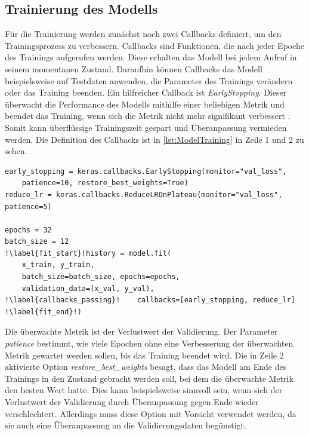 \subsection{Trainierung des Modells}
\label{sec:Trainierung}
Für die Trainierung werden zunächst noch zwei Callbacks definiert, um den Trainingsprozess zu verbessern.
Callbacks sind Funktionen, die nach jeder Epoche des Trainings aufgerufen werden.
Diese erhalten das Modell bei jedem Aufruf in seinem momentanen Zustand.
Daraufhin können Callbacks das Modell beispielsweise auf Testdaten anwenden, die Parameter des Trainings verändern oder das Training beenden.
Ein hilfreicher Callback ist \emph{EarlyStopping}.
Dieser überwacht die Performance des Modells mithilfe einer beliebigen Metrik und beendet das Training, wenn sich die Metrik nicht mehr signifikant verbessert \cite{KerasEarlyStopping}.
Somit kann überflüssige Trainingszeit gespart und Überanpassung vermieden werden.
Die Definition des Callbacks ist in \autoref{lst:ModelTraining} in Zeile 1 und 2 zu sehen.

\begin{minipage}{\textwidth}
\begin{code}
\begin{verbatim}
early_stopping = keras.callbacks.EarlyStopping(monitor="val_loss",
    patience=10, restore_best_weights=True)
reduce_lr = keras.callbacks.ReduceLROnPlateau(monitor="val_loss", patience=5)

epochs = 32
batch_size = 12
!\label{fit_start}!history = model.fit(
    x_train, y_train,
    batch_size=batch_size, epochs=epochs,
    validation_data=(x_val, y_val),
!\label{callbacks_passing}!    callbacks=[early_stopping, reduce_lr]
!\label{fit_end}!)
\end{verbatim}
\label{lst:ModelTraining}
\end{code}
\end{minipage}

Die überwachte Metrik ist der Verlustwert der Validierung.
Der Parameter \emph{patience} bestimmt, wie viele Epochen ohne eine Verbesserung der überwachten Metrik gewartet werden sollen, bis das Training beendet wird.
Die in Zeile 2 aktivierte Option \emph{restore\_best\_weights} besagt, dass das Modell am Ende des Trainings in den Zustand gebracht werden soll, bei dem die überwachte Metrik den besten Wert hatte.
Dies kann beispielsweise sinnvoll sein, wenn sich der Verlustwert der Validierung durch Überanpassung gegen Ende wieder verschlechtert.
Allerdings muss diese Option mit Vorsicht verwendet werden, da sie auch eine Überanpassung an die Validierungsdaten begünstigt.


